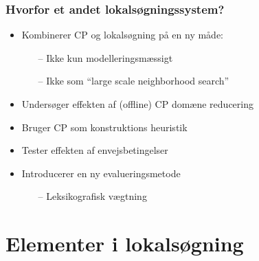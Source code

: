 \documentclass[smaller]{beamer}
\begin{document}
\begin{frame}
 \frametitle{Hvorfor et andet lokalsøgningssystem?}
 \begin{itemize}[<+->]
 \item Kombinerer CP og lokalsøgning på en ny måde: 
 \begin{itemize}[<+->]
  \item[--] Ikke kun modelleringsmæssigt
  \item[--] Ikke som ``large scale neighborhood search''
 \end{itemize}
 \item Undersøger effekten af (offline) CP domæne reducering
 \item Bruger CP som konstruktions heuristik
 \item Tester effekten af envejsbetingelser
 \item Introducerer en ny evalueringsmetode
  \begin{itemize}[<+->]
  \item[--] Leksikografisk vægtning
 \end{itemize}
 \end{itemize}
\end{frame}


\section{Elementer i lokalsøgning}
% 
%  
% 
\end{document}
